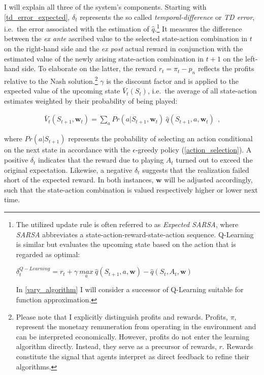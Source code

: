 I will explain all three of the system's components. Starting with \autoref{td_error_expected}, $\delta_t$ represents the so called \emph{temporal-difference} or \emph{TD error}, i.e.\ the error associated with the estimation of $\hat{q}$.\footnote{The utilized update rule is often referred to as \emph{Expected SARSA}, where \emph{SARSA} abbreviates a state-action-reward-state-action sequence. Q-Learning is similar but evaluates the upcoming state based on the action that is regarded as optimal:
	\begin{center}
		$\delta_t^{Q-Learning} = r_t + \gamma ~ \underset{a}{max} ~ \hat{q}(S_{t+1}, a, \boldsymbol{w}) - \hat{q}(S_t, A_t, \boldsymbol{w})$
	\end{center}
	In \autoref{vary_algorithm} I will consider a successor of Q-Learning suitable for function approximation.} It measures the difference between the \emph{ex ante} ascribed value to the selected state-action combination in $t$ on the right-hand side and the \emph{ex post} actual reward in conjunction with the estimated value of the newly arising state-action combination in $t+1$ on the left-hand side. To elaborate on the latter, the reward $r_t = \pi_t - p_n$ reflects the profits relative to the Nash solution.\footnote{Please note that I explicitly distinguish profits and rewards. Profits, $\pi$, represent the monetary remuneration from operating in the environment and can be interpreted economically. However, profits do not enter the learning algorithm directly. Instead, they serve as a precursor of rewards, $r$. Rewards constitute the signal that agents interpret as direct feedback to refine their algorithms.} $\gamma$ is the discount factor and is applied to the expected value of the upcoming state $\bar{V}_t(S_t)$, i.e.\ the average of all state-action estimates weighted by their probability of being played:

\begin{gather}\label{expected_state_value}
\bar{V}_t(S_{t+1}, \boldsymbol{w}_t) = \sum_{a} Pr(a|S_{t+1}, \boldsymbol{w}_t) ~ \hat{q}(S_{t+1}, a, \boldsymbol{w}_t) ~~   \text{,}
\end{gather}

where $Pr(a|S_{t+1})$ represents the probability of selecting an action conditional on the next state in accordance with the $\epsilon$-greedy policy (\autoref{action_selection}). A positive $\delta_t$ indicates that the reward due to playing $A_t$ turned out to exceed the original expectation. Likewise, a negative $\delta_t$ suggests that the realization failed short of the expected reward. In both instances, $\boldsymbol{w}$ will be adjusted accordingly, such that the state-action combination is valued respectively higher or lower next time.

